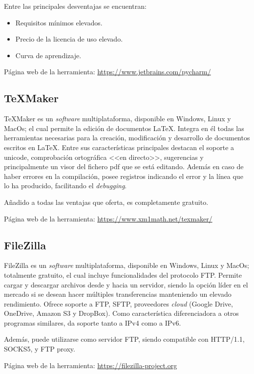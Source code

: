 Entre las principales desventajas se encuentran:
\begin{itemize}
\tightlist
\item Requisitos mínimos elevados. 
\item Precio de la licencia de uso elevado.
\item Curva de aprendizaje.
\end{itemize}

Página web de la herramienta: \url{https://www.jetbrains.com/pycharm/}

\subsection{\TeX Maker}
\TeX Maker es un \textit{software} multiplataforma, disponible en Windows, Linux y MacOs; el cual permite la edición de documentos \LaTeX. Integra en él todas las herramientas necesarias para la creación, modificación y desarrollo de documentos escritos en \LaTeX. Entre sus características principales destacan el soporte a unicode, comprobación ortográfica <<en directo>>, sugerencias y principalmente un visor del fichero pdf que se está editando. Además en caso de haber errores en la compilación, posee registros indicando el error y la línea que lo ha producido, facilitando el \textit{debugging}.

Añadido a todas las ventajas que oferta, es completamente gratuito.

Página web de la herramienta: \url{https://www.xm1math.net/texmaker/}

\subsection{FileZilla}
FileZilla es un \textit{software} multiplataforma, disponible en Windows, Linux y MacOs; totalmente gratuito, el cual incluye funcionalidades del protocolo FTP. Permite cargar y descargar archivos desde y hacia un servidor, siendo la opción líder en el mercado si se desean hacer múltiples transferencias manteniendo un elevado rendimiento. Ofrece soporte a FTP, SFTP, proveedores \textit{cloud} (Google Drive, OneDrive, Amazon S3 y DropBox). Como característica diferenciadora a otros programas similares, da soporte tanto a IPv4 como a IPv6. 

Además, puede utilizarse como servidor FTP, siendo compatible con HTTP/1.1, SOCKS5, y FTP proxy. 


Página web de la herramienta: \url{https://filezilla-project.org}

